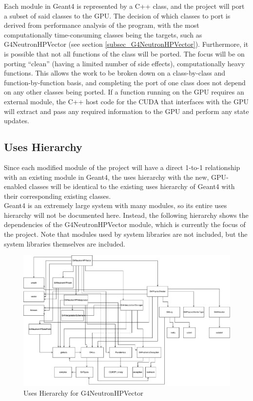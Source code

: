 \documentclass[12pt]{article}
\begin{document}
Each module in Geant4 is represented by a C++ class, and the project will port a subset of said classes to the GPU. The decision of which classes to port is derived from performance analysis of the program, with the most computationally time-consuming classes being the targets, such as G4NeutronHPVector (see section \ref{subsec_G4NeutronHPVector}). Furthermore, it is possible that not all functions of the class will be ported. The focus will be on porting ``clean'' (having a limited number of side effects), computationally heavy functions. This allows the work to be broken down on a class-by-class and function-by-function basis, and completing the port of one class does not depend on any other classes being ported. If a function running on the GPU requires an external module, the C++ host code for the CUDA that interfaces with the GPU will extract and pass any required information to the GPU and perform any state updates.

\subsection{Uses Hierarchy}
Since each modified module of the project will have a direct 1-to-1 relationship with an existing module in Geant4, the uses hierarchy with the new, GPU-enabled classes will be identical to the existing uses hierarchy of Geant4 with their corresponding existing classes.\\

Geant4 is an extremely large system with many modules, so its entire uses hierarchy will not be documented here. Instead, the following hierarchy shows the dependencies of the G4NeutronHPVector module, which is currently the focus of the project. Note that modules used by system libraries are not included, but the system libraries themselves are included.
\begin{figure}[h]
\caption{Uses Hierarchy for G4NeutronHPVector}\label{imgUsesHierarchy}
\includegraphics[width=\textwidth]{uses_hierarchy.pdf}
\end{figure}
\end{document}

